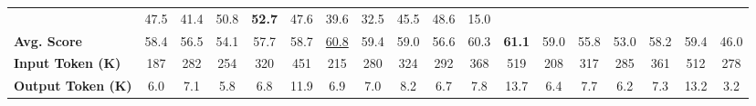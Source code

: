 \begin{table}[t]
{\begin{tabular}{l|ccccc|cccccc|ccccc|c}
      & 47.5 & 41.4 & 50.8 & \textbf{52.7} & 47.6 & 39.6 & 32.5 & 45.5 & 48.6
      & 15.0 \\
      \textbf{Avg. Score} & 58.4 & 56.5 & 54.1 & 57.7 & 58.7 & \underline{60.8} & 59.4
      & 59.0 & 56.6 & 60.3 &\textbf{61.1} & 59.0 & 55.8 & 53.0 & 58.2 & 59.4
      & 46.0 \\
      \textbf{Input Token (K)} & 187 & 282 & 254 & 320 & 451 & 215 & 280
      & 324 & 292 & 368 & 519 & 208 & 317 & 285 & 361 & 512
      & 278 \\
      \textbf{Output Token (K)} & 6.0 & 7.1 & 5.8 & 6.8 & 11.9 & 6.9 & 7.0
      & 8.2 & 6.7 & 7.8 & 13.7 & 6.4 & 7.7 & 6.2 & 7.3 & 13.2
      & 3.2 \\
      \bottomrule
    \end{tabular}%
  }
\end{table}

